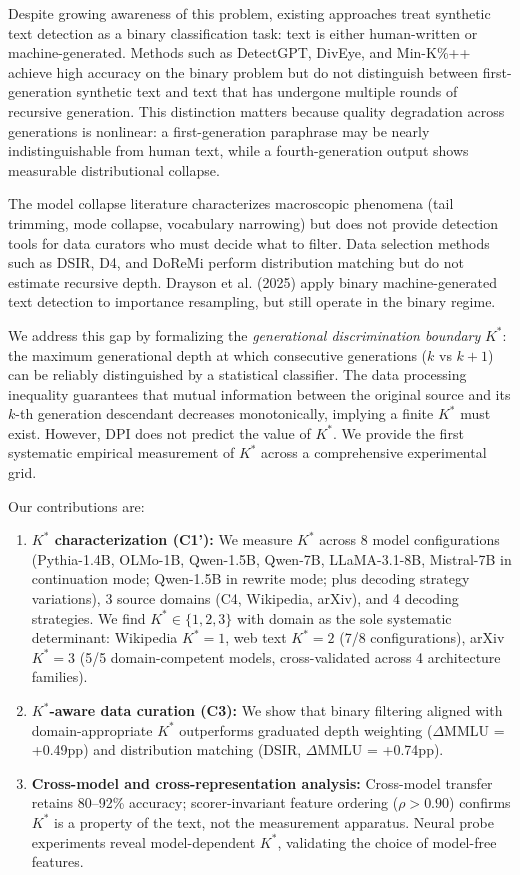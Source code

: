\documentclass[11pt,a4paper]{article}
\begin{document}
Despite growing awareness of this problem, existing approaches treat synthetic text detection as a binary classification task: text is either human-written or machine-generated. Methods such as DetectGPT, DivEye, and Min-K\%++ achieve high accuracy on the binary problem but do not distinguish between first-generation synthetic text and text that has undergone multiple rounds of recursive generation. This distinction matters because quality degradation across generations is nonlinear: a first-generation paraphrase may be nearly indistinguishable from human text, while a fourth-generation output shows measurable distributional collapse.

The model collapse literature characterizes macroscopic phenomena (tail trimming, mode collapse, vocabulary narrowing) but does not provide detection tools for data curators who must decide what to filter. Data selection methods such as DSIR, D4, and DoReMi perform distribution matching but do not estimate recursive depth. Drayson et al. (2025) apply binary machine-generated text detection to importance resampling, but still operate in the binary regime.

We address this gap by formalizing the \emph{generational discrimination boundary} $K^*$: the maximum generational depth at which consecutive generations ($k$ vs $k+1$) can be reliably distinguished by a statistical classifier. The data processing inequality guarantees that mutual information between the original source and its $k$-th generation descendant decreases monotonically, implying a finite $K^*$ must exist. However, DPI does not predict the value of $K^*$. We provide the first systematic empirical measurement of $K^*$ across a comprehensive experimental grid.

Our contributions are:
\begin{enumerate}[leftmargin=*]
\item \textbf{$K^*$ characterization (C1'):} We measure $K^*$ across 8 model configurations (Pythia-1.4B, OLMo-1B, Qwen-1.5B, Qwen-7B, LLaMA-3.1-8B, Mistral-7B in continuation mode; Qwen-1.5B in rewrite mode; plus decoding strategy variations), 3 source domains (C4, Wikipedia, arXiv), and 4 decoding strategies. We find $K^* \in \{1,2,3\}$ with domain as the sole systematic determinant: Wikipedia $K^*=1$, web text $K^*=2$ (7/8 configurations), arXiv $K^*=3$ (5/5 domain-competent models, cross-validated across 4 architecture families).

\item \textbf{$K^*$-aware data curation (C3):} We show that binary filtering aligned with domain-appropriate $K^*$ outperforms graduated depth weighting ($\Delta$MMLU = +0.49pp) and distribution matching (DSIR, $\Delta$MMLU = +0.74pp).

\item \textbf{Cross-model and cross-representation analysis:} Cross-model transfer retains 80--92\% accuracy; scorer-invariant feature ordering ($\rho > 0.90$) confirms $K^*$ is a property of the text, not the measurement apparatus. Neural probe experiments reveal model-dependent $K^*$, validating the choice of model-free features.
\end{enumerate}
\end{document}
